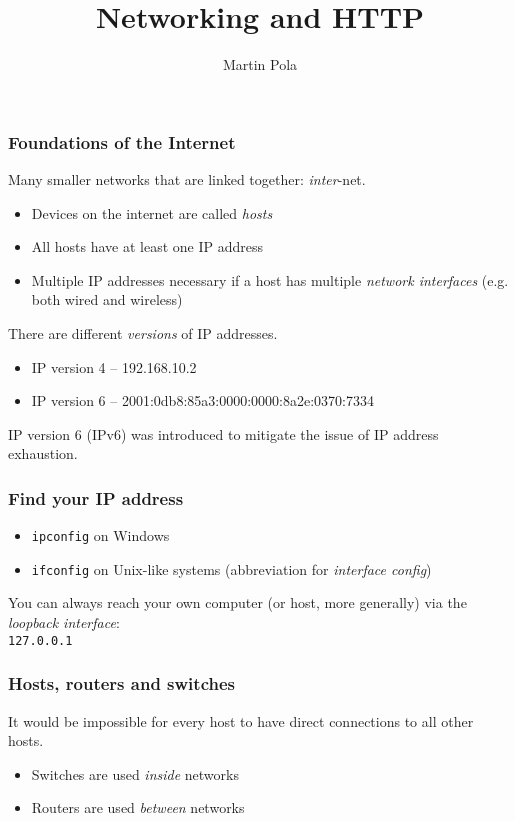 \documentclass{beamer}
\title{Networking and HTTP}
\author{Martin Pola}
\date{}
\begin{document}
	\maketitle
	
	\frame
	{
		\frametitle{Foundations of the Internet}
		Many smaller networks that are linked together: \emph{inter}-net.

		\begin{itemize}
			\item Devices on the internet are called \emph{hosts}
			\item All hosts have at least one IP address
			\item Multiple IP addresses necessary if a host has multiple \emph{network interfaces} (e.g. both wired and wireless)
		\end{itemize}

		There are different \emph{versions} of IP addresses.

		\begin{itemize}
			\item IP version 4 -- 192.168.10.2
			\item IP version 6 -- 2001:0db8:85a3:0000:0000:8a2e:0370:7334
		\end{itemize}

		IP version 6 (IPv6) was introduced to mitigate the issue of IP address exhaustion.
	}

	\begin{frame}
		\frametitle{Find your IP address}
	
		\begin{itemize}
			\item \texttt{ipconfig} on Windows
			\item \texttt{ifconfig} on Unix-like systems (abbreviation for \emph{interface config})
		\end{itemize}

		You can always reach your own computer (or host, more generally) via the \emph{loopback interface}: \\
		\texttt{127.0.0.1}
	\end{frame}

	\begin{frame}
		\frametitle{Hosts, routers and switches}
		It would be impossible for every host to have direct connections to all other hosts.

		\next
	
		\begin{itemize}
			\item Switches are used \emph{inside} networks
			\item Routers are used \emph{between} networks
		\end{itemize}
	\end{frame}
\end{document}
